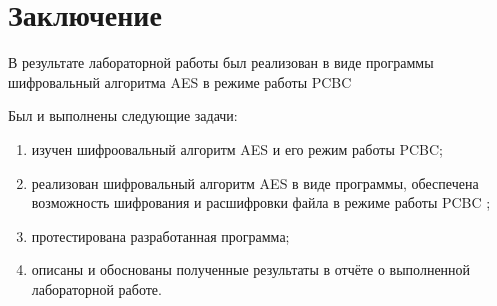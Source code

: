 \chapter*{Заключение}

В результате лабораторной работы был реализован в виде программы шифровальный алгоритма AES в режиме работы PCBC 

Был и выполнены следующие задачи:
\begin{enumerate}[label=\arabic*)]
	\item изучен шифроовальный алгоритм AES и его режим работы PCBC;
    \item реализован шифровальный алгоритм AES в виде программы, обеспечена возможность шифрования и расшифровки файла в режиме работы PCBC	;
	\item протестирована разработанная программа;
	\item описаны и обоснованы полученные результаты в отчёте о выполненной лабораторной работе.
\end{enumerate}